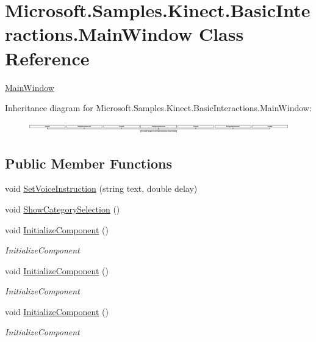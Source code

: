 \hypertarget{class_microsoft_1_1_samples_1_1_kinect_1_1_basic_interactions_1_1_main_window}{\section{Microsoft.\-Samples.\-Kinect.\-Basic\-Interactions.\-Main\-Window Class Reference}
\label{class_microsoft_1_1_samples_1_1_kinect_1_1_basic_interactions_1_1_main_window}
}


\hyperlink{class_microsoft_1_1_samples_1_1_kinect_1_1_basic_interactions_1_1_main_window}{Main\-Window}  


Inheritance diagram for Microsoft.\-Samples.\-Kinect.\-Basic\-Interactions.\-Main\-Window\-:\begin{figure}[H]
\begin{center}
\leavevmode
\includegraphics[height=0.471976cm]{class_microsoft_1_1_samples_1_1_kinect_1_1_basic_interactions_1_1_main_window}
\end{center}
\end{figure}
\subsection*{Public Member Functions}
\begin{DoxyCompactItemize}
\item 
void \hyperlink{class_microsoft_1_1_samples_1_1_kinect_1_1_basic_interactions_1_1_main_window_a1e58e752cad09fd8202b483e898ad68c}{Set\-Voice\-Instruction} (string text, double delay)
\item 
void \hyperlink{class_microsoft_1_1_samples_1_1_kinect_1_1_basic_interactions_1_1_main_window_ac86cc691613884904b7fded6375a9908}{Show\-Category\-Selection} ()
\item 
void \hyperlink{class_microsoft_1_1_samples_1_1_kinect_1_1_basic_interactions_1_1_main_window_ac85fa4f67425407902fbd916a4fcc703}{Initialize\-Component} ()
\begin{DoxyCompactList}\small\item\em Initialize\-Component \end{DoxyCompactList}\item 
void \hyperlink{class_microsoft_1_1_samples_1_1_kinect_1_1_basic_interactions_1_1_main_window_ac85fa4f67425407902fbd916a4fcc703}{Initialize\-Component} ()
\begin{DoxyCompactList}\small\item\em Initialize\-Component \end{DoxyCompactList}\item 
void \hyperlink{class_microsoft_1_1_samples_1_1_kinect_1_1_basic_interactions_1_1_main_window_ac85fa4f67425407902fbd916a4fcc703}{Initialize\-Component} ()
\begin{DoxyCompactList}\small\item\em Initialize\-Component \end{DoxyCompactList}\end{DoxyCompactItemize}


